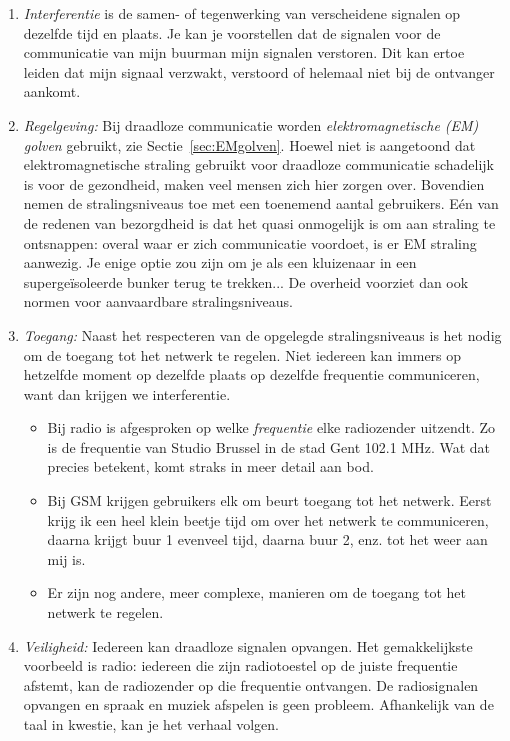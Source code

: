  \begin{enumerate}
     \item \emph{Interferentie} is de samen- of tegenwerking van verscheidene signalen op dezelfde tijd en plaats. Je kan je voorstellen dat de signalen voor de communicatie van mijn buurman mijn signalen verstoren. Dit kan ertoe leiden dat mijn signaal verzwakt, verstoord of helemaal niet bij de ontvanger aankomt.
     \item \emph{Regelgeving:} Bij draadloze communicatie worden \emph{elektromagnetische (EM) golven} gebruikt, zie Sectie~\ref{sec:EMgolven}. Hoewel niet is aangetoond dat elektromagnetische straling gebruikt voor draadloze communicatie schadelijk is voor de gezondheid, maken veel mensen zich hier zorgen over. Bovendien nemen de stralingsniveaus toe met een toenemend aantal gebruikers. E\'en van de redenen van bezorgdheid is dat het quasi onmogelijk is om aan straling te ontsnappen: overal waar er zich communicatie voordoet, is er EM straling aanwezig. Je enige optie zou zijn om je als een kluizenaar in een supergeïsoleerde bunker terug te trekken... De overheid voorziet dan ook normen voor aanvaardbare stralingsniveaus. 
     \item \emph{Toegang: } Naast het respecteren van de opgelegde stralingsniveaus is het nodig om de toegang tot het netwerk te regelen. Niet iedereen kan immers op hetzelfde moment op dezelfde plaats op dezelfde frequentie communiceren, want dan krijgen we interferentie.
     \begin{itemize}
         \item Bij radio is afgesproken op welke \emph{frequentie} elke radiozender uitzendt. Zo is de frequentie van Studio Brussel in de stad Gent 102.1 MHz. Wat dat precies betekent, komt straks in meer detail aan bod. 
         \item Bij GSM krijgen gebruikers elk om beurt toegang tot het netwerk. Eerst krijg ik een heel klein beetje tijd om over het netwerk te communiceren, daarna krijgt buur 1 evenveel tijd, daarna buur 2, enz. tot het weer aan mij is.
         \item Er zijn nog andere, meer complexe, manieren om de toegang tot het netwerk te regelen.
     \end{itemize} 
     \item \emph{Veiligheid: } Iedereen kan draadloze signalen opvangen. Het gemakkelijkste voorbeeld is radio: iedereen die zijn radiotoestel op de juiste frequentie afstemt, kan de radiozender op die frequentie ontvangen. De radiosignalen opvangen en spraak en muziek afspelen is geen probleem. Afhankelijk van de taal in kwestie, kan je het verhaal volgen.
    

\end{enumerate}
